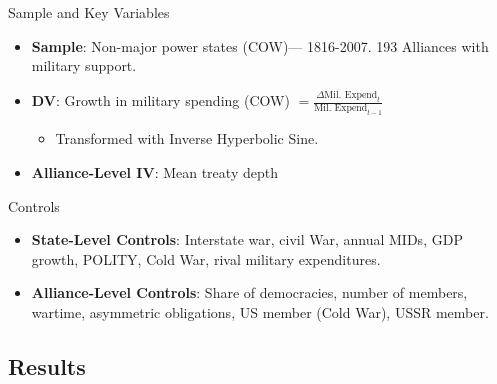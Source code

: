 \documentclass[12pt]{beamer}
\begin{document}
\begin{frame}{Sample and Key Variables}

\begin{itemize}
\item \textbf{Sample}: Non-major power states (COW)--- 1816-2007. 193 Alliances with military support. 
\pause
\item \textbf{DV}: Growth in military spending (COW) $ = \frac{ \Delta \mbox{Mil. Expend}_t }{ \mbox{Mil. Expend}_{t-1} }$ 
\pause
\begin{itemize} 
\item Transformed with Inverse Hyperbolic Sine. 
\end{itemize} 
\pause
\item \textbf{Alliance-Level IV}: Mean treaty depth
\end{itemize} 

\end{frame}



\begin{frame}{Controls}

\begin{itemize}
\item \textbf{State-Level Controls}: Interstate war, civil War, annual MIDs, GDP growth, POLITY, Cold War, rival military expenditures. 
\pause 
\item \textbf{Alliance-Level Controls}: Share of democracies, number of members, wartime, asymmetric obligations, US member (Cold War), USSR member.

\end{itemize} 

\end{frame}



\subsection{Results}

\end{document}
